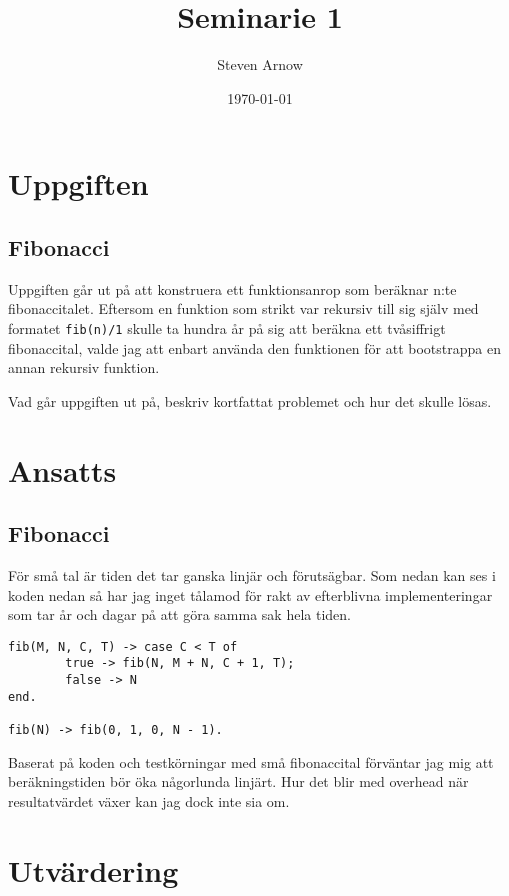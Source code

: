 \documentclass[a4paper, 11pt]{article}
\title{Seminarie 1}
\author{Steven Arnow}
\date{\today}
\begin{document}
\maketitle 

\section{Uppgiften}

\subsection{Fibonacci}
Uppgiften går ut på att konstruera ett funktionsanrop som beräknar n:te fibonaccitalet. Eftersom en funktion som strikt var rekursiv till sig själv med formatet \texttt{fib(n)/1} skulle ta hundra år på sig att beräkna ett tvåsiffrigt fibonaccital, valde jag att enbart använda den funktionen för att bootstrappa en annan rekursiv funktion.

Vad går uppgiften ut på, beskriv kortfattat problemet och hur det skulle lösas.

\section{Ansatts}

\subsection{Fibonacci}

För små tal är tiden det tar ganska linjär och förutsägbar. Som nedan kan ses i koden nedan så har jag inget tålamod för rakt av efterblivna implementeringar som tar år och dagar på att göra samma sak hela tiden.

\begin{verbatim}
fib(M, N, C, T) -> case C < T of
        true -> fib(N, M + N, C + 1, T);
        false -> N
end.

fib(N) -> fib(0, 1, 0, N - 1).
\end{verbatim}

Baserat på koden och testkörningar med små fibonaccital förväntar jag mig att beräkningstiden bör öka någorlunda linjärt. Hur det blir med overhead när resultatvärdet växer kan jag dock inte sia om.


\section{Utvärdering}
\end{document}
